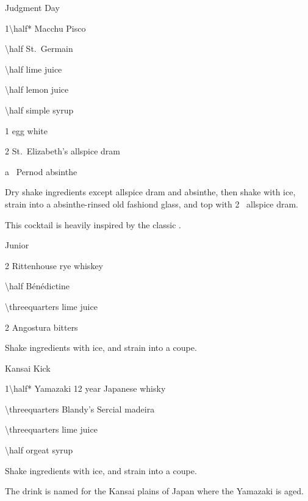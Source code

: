 \begin{Cocktail}[\PDT]{Judgment Day}
  \begin{Ingredients}
    \item \SI{1\half*}{\oz} Macchu Pisco
    \item \SI{\half}{\oz} St.\ Germain
    \item \SI{\half}{\oz} lime juice
    \item \SI{\half}{\oz} lemon juice
    \item \SI{\half}{\oz} simple syrup
    \item 1 egg white
    \item 2 \si{\spritzes} St.\ Elizabeth's allspice dram
    \item a~\si{\rinse} Pernod absinthe
  \end{Ingredients}
  
  \begin{Instructions}
    Dry shake ingredients except allspice dram and absinthe, then shake with
    ice, strain into a absinthe-rinsed old fashiond glass, and top with
    2~\si{\spritzes} allspice dram.

    This cocktail is heavily inspired by the classic .
  \end{Instructions}
\end{Cocktail}

\begin{Cocktail}[\PDT*]{Junior}
  \begin{Ingredients}
  \item \SI{2}{\oz} Rittenhouse rye whiskey
  \item \SI{\half}{\oz} B\'en\'edictine
  \item \SI{\threequarters}{\oz} lime juice
  \item 2 \si{\dashes} Angostura bitters
  \end{Ingredients}
  
  \begin{Instructions}
	Shake ingredients with ice, and strain into a coupe.
  \end{Instructions}
\end{Cocktail}

\begin{Cocktail}[\PDT]{Kansai Kick}
  \begin{Ingredients}
  \item \SI{1\half*}{\oz} Yamazaki 12 year Japanese whisky
  \item \SI{\threequarters}{\oz} Blandy's Sercial madeira
  \item \SI{\threequarters}{\oz} lime juice
  \item \SI{\half}{\oz} orgeat syrup
  \end{Ingredients}
  
  \begin{Instructions}
	Shake ingredients with ice, and strain into a coupe.
	
	The drink is named for the Kansai plains of Japan where the Yamazaki is aged.
  \end{Instructions}
\end{Cocktail}


